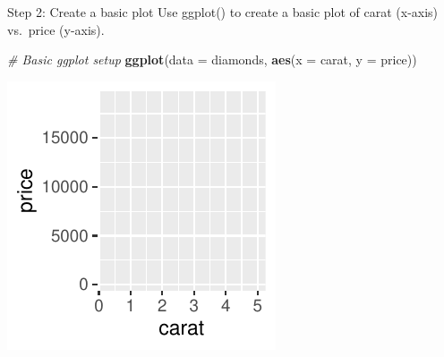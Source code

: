 \documentclass[
  ignorenonframetext,
]{beamer}
\newenvironment{Shaded}{\begin{snugshade}}{\end{snugshade}}
\newcommand{\AttributeTok}[1]{\textcolor[rgb]{0.13,0.29,0.53}{#1}}
\newcommand{\CommentTok}[1]{\textcolor[rgb]{0.56,0.35,0.01}{\textit{#1}}}
\newcommand{\FunctionTok}[1]{\textcolor[rgb]{0.13,0.29,0.53}{\textbf{#1}}}
\newcommand{\NormalTok}[1]{#1}
\begin{document}
\begin{frame}[fragile]{Step 2: Create a basic plot}
\label{step-2-create-a-basic-plot}
Use ggplot() to create a basic plot of carat (x-axis) vs.~price
(y-axis).


\begin{Shaded}
\begin{Highlighting}[]
\CommentTok{\# Basic ggplot setup}
\FunctionTok{ggplot}\NormalTok{(}\AttributeTok{data =}\NormalTok{ diamonds, }\FunctionTok{aes}\NormalTok{(}\AttributeTok{x =}\NormalTok{ carat, }\AttributeTok{y =}\NormalTok{ price))}
\end{Highlighting}
\end{Shaded}

\begin{center}\includegraphics[width=0.5\linewidth]{Figs/unnamed-chunk-2-1} \end{center}
\end{frame}
\end{document}

